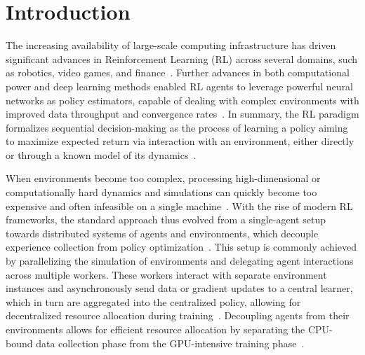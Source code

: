 
\chapter{Introduction}
\label{ch:introduction}

The increasing availability of large-scale computing infrastructure has driven significant advances
in Reinforcement Learning (RL) across several domains, such as robotics, video games, and finance~\citep{Yin2024,Hou2025,Huh2023}.
Further advances in both computational power and deep learning methods enabled RL agents to leverage powerful neural networks
as policy estimators, capable of dealing with complex environments with improved data throughput and convergence rates~\citep{Zheng2023,Jia2024}.
In summary, the RL paradigm formalizes sequential decision-making as the process of learning a policy aiming to maximize expected return
via interaction with an environment, either directly or through a known model of its dynamics~\citep{Zhu2022}.

When environments become too complex, processing high-dimensional or computationally hard dynamics and simulations
can quickly become too expensive and often infeasible on a single machine~\citep{Goudarzi2023,Fan2024}.
With the rise of modern RL frameworks, the standard approach thus evolved from a single-agent setup towards
distributed systems of agents and environments, which decouple experience collection from policy optimization~\citep{Furukawa2022,Kopic2024}.
This setup is commonly achieved by parallelizing the simulation of environments and delegating agent interactions across multiple workers.
These workers interact with separate environment instances and asynchronously send data or gradient updates to a central learner,
which in turn are aggregated into the centralized policy, allowing for decentralized resource allocation during training~\citep{Cho2023}.
Decoupling agents from their environments allows for efficient resource allocation by separating the CPU-bound data collection phase from the GPU-intensive training phase~\citep{Fayaz2022,Lu2021}.

